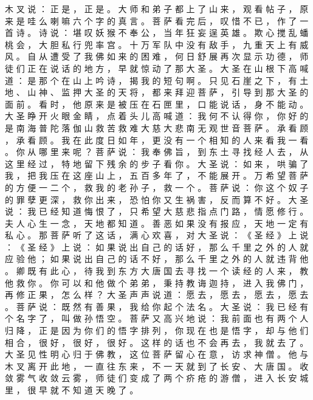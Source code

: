 {木 叉 说 ： 正 是 ， 正 是 。
大 师 和 弟 子 都 上 了 山 来 ， 观 看 帖 子 ， 原 来 是 哇 么 喇 嘛 六 个 字 的 真 言 。
菩 萨 看 完 后 ， 叹 惜 不 已 ， 作 了 一 首 诗 。
诗 说 ： 堪 叹 妖 猴 不 奉 公 ， 当 年 狂 妄 逞 英 雄 。
欺 心 搅 乱 蟠 桃 会 ， 大 胆 私 行 兜 率 宫 。
十 万 军 队 中 没 有 敌 手 ， 九 重 天 上 有 威 风 。
自 从 遭 受 了 我 佛 如 来 的 困 难 ， 何 日 舒 展 再 次 显 示 功 德 ， 师 徒 们 正 在 说 话 的 地 方 ， 早 就 惊 动 了 那 大 圣 。
大 圣 在 山 根 下 高 喊 道 ： 是 那 个 在 山 上 吟 诗 ， 揭 我 的 短 句 啊 。
只 见 石 崖 之 下 ， 有 土 地 、 山 神 、 监 押 大 圣 的 天 将 ， 都 来 拜 迎 菩 萨 ， 引 导 到 那 大 圣 的 面 前 。
看 时 ， 他 原 来 是 被 压 在 石 匣 里 ， 口 能 说 话 ， 身 不 能 动 。
大 圣 睁 开 火 眼 金 睛 ， 点 着 头 儿 高 喊 道 ： 我 何 不 认 得 你 ， 你 好 的 是 南 海 普 陀 落 伽 山 救 苦 救 难 大 慈 大 悲 南 无 观 世 音 菩 萨 。
承 看 顾 ， 承 看 顾 。
我 在 此 度 日 如 年 ， 更 没 有 一 个 相 知 的 人 来 看 我 一 看 。
你 从 哪 里 来 呢 ？ 菩 萨 说 ： 我 奉 佛 旨 ， 到 东 土 寻 找 经 人 去 ， 从 这 里 经 过 ， 特 地 留 下 残 余 的 步 子 看 你 。
大 圣 说 ： 如 来 ， 哄 骗 了 我 ， 把 我 压 在 这 座 山 上 ， 五 百 多 年 了 ， 不 能 展 开 。
万 希 望 菩 萨 的 方 便 一 二 个 ， 救 我 的 老 孙 子 ， 救 一 个 。
菩 萨 说 ： 你 这 个 奴 子 的 罪 孽 更 深 ， 救 你 出 来 ， 恐 怕 你 又 生 祸 害 ， 反 而 算 不 好 。
大 圣 说 ： 我 已 经 知 道 悔 恨 了 ， 只 希 望 大 慈 悲 指 点 门 路 ， 情 愿 修 行 。
夫 人 心 生 一 念 ， 天 地 都 知 道 。
善 恶 如 果 没 有 报 应 ， 天 地 一 定 有 私 心 。
那 菩 萨 听 了 这 话 ， 满 心 欢 喜 ， 对 大 圣 说 ： 《 圣 经 》 上 说 ： 《 圣 经 》 上 说 ： 如 果 说 出 自 己 的 话 好 ， 那 么 千 里 之 外 的 人 就 应 验 他 ； 如 果 说 出 自 己 的 话 不 好 ， 那 么 千 里 之 外 的 人 就 违 背 他 。
卿 既 有 此 心 ， 待 我 到 东 方 大 唐 国 去 寻 找 一 个 读 经 的 人 来 ， 教 他 救 你 。
你 可 以 和 他 做 个 弟 弟 ， 秉 持 教 诲 迦 持 ， 进 入 我 佛 门 ， 再 修 正 果 ， 怎 么 样 ？ 大 圣 声 声 说 道 ： 愿 去 ， 愿 去 ， 愿 去 ， 愿 去 。
菩 萨 说 ： 既 然 有 善 果 ， 我 给 你 起 个 法 名 。
大 圣 说 ： 我 已 经 有 个 名 字 了 ， 叫 做 孙 悟 空 。
菩 萨 又 高 兴 地 说 ： 我 前 面 也 有 两 个 人 归 降 ， 正 是 因 为 你 们 的 悟 字 排 列 ， 你 现 在 也 是 悟 字 ， 却 与 他 们 相 合 ， 很 好 ， 很 好 ， 很 好 。
这 样 的 话 也 不 会 再 去 ， 我 就 去 了 。
大 圣 见 性 明 心 归 于 佛 教 ， 这 位 菩 萨 留 心 在 意 ， 访 求 神 僧 。
他 与 木 叉 离 开 此 地 ， 一 直 往 东 来 ， 不 一 天 就 到 了 长 安 、 大 唐 国 。
收 敛 雾 气 收 敛 云 雾 ， 师 徒 们 变 成 了 两 个 疥 疮 的 游 僧 ， 进 入 长 安 城 里 ， 很 早 就 不 知 道 天 晚 了 。
}
